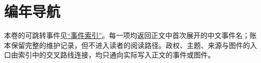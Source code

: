 \section{编年导航}
\label{app:navigation}

本卷的可跳转事件见\hyperref[app:event-index]{“事件索引”}。每一项均返回正文中首次展开的中文事件名；账本保留完整的维护记录，但不进入读者的阅读路径。政权、主题、来源与图件的入口由索引中的交叉路线连接，均只通向实际写入正文的事件或图件。
